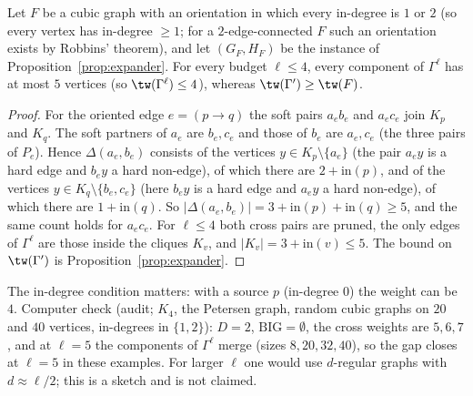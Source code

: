 \begin{proposition}\label{prop:Pstrict}
Let $F$ be a cubic graph with an orientation in which every in-degree is $1$ or $2$ (so every vertex has in-degree $\ge1$; for a $2$-edge-connected $F$ such an orientation exists by Robbins' theorem), and let $(G_F,H_F)$ be the instance of Proposition~\ref{prop:expander}. For every budget $\ell\le4$, every component of $\Gamma^\ell$ has at most $5$ vertices (so $\tw(\Gamma^\ell)\le4$), whereas $\tw(\Gamma')\ge\tw(F)$.
\end{proposition}
\begin{proof}
For the oriented edge $e=(p\to q)$ the soft pairs $a_eb_e$ and $a_ec_e$ join $K_p$ and $K_q$. The soft partners of $a_e$ are $b_e,c_e$ and those of $b_e$ are $a_e,c_e$ (the three pairs of $P_e$). Hence $\Delta(a_e,b_e)$ consists of the vertices $y\in K_p\setminus\{a_e\}$ (the pair $a_ey$ is a hard edge and $b_ey$ a hard non-edge), of which there are $2+\mathrm{in}(p)$, and of the vertices $y\in K_q\setminus\{b_e,c_e\}$ (here $b_ey$ is a hard edge and $a_ey$ a hard non-edge), of which there are $1+\mathrm{in}(q)$. So $|\Delta(a_e,b_e)|=3+\mathrm{in}(p)+\mathrm{in}(q)\ge5$, and the same count holds for $a_ec_e$. For $\ell\le4$ both cross pairs are pruned, the only edges of $\Gamma^\ell$ are those inside the cliques $K_v$, and $|K_v|=3+\mathrm{in}(v)\le5$. The bound on $\tw(\Gamma')$ is Proposition~\ref{prop:expander}.
\end{proof}
The in-degree condition matters: with a source $p$ (in-degree $0$) the weight can be $4$. Computer check (audit; $K_4$, the Petersen graph, random cubic graphs on $20$ and $40$ vertices, in-degrees in $\{1,2\}$): $D=2$, $\mathrm{BIG}=\emptyset$, the cross weights are $5,6,7$, and at $\ell=5$ the components of $\Gamma^\ell$ merge (sizes $8,20,32,40$), so the gap closes at $\ell=5$ in these examples. For larger $\ell$ one would use $d$-regular graphs with $d\approx\ell/2$; this is a sketch and is not claimed.

